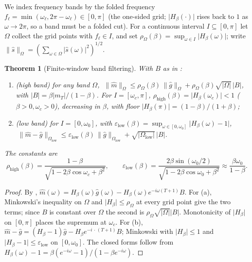 \documentclass[11pt,a4paper]{article}
\newtheorem{theorem}{Theorem}
\theoremstyle{remark}
\newcommand{\Hmag}[1]{\lvert H_\beta(#1)\rvert}
\newcommand{\rhohigh}{\rho_{\mathrm{high}}}
\newcommand{\epslow}{\varepsilon_{\mathrm{low}}}
\begin{document}
We index frequency bands by the folded frequency $f_\ell=\min(\omega_\ell,2\pi-\omega_\ell)\in[0,\pi]$ (the one-sided grid; $\Hmag{\cdot}$ rises back to $1$ as $\omega\to2\pi$, so a band must be a folded cut).
For a continuous interval $I\subseteq[0,\pi]$ let $\Omega$ collect the grid points with $f_\ell\in I$, and set $\rho_\Omega(\beta)=\sup_{\omega\in I}\Hmag{\omega}$; write $\lVert\hat s\rVert_\Omega=(\sum_{\omega\in\Omega}\lvert\hat s(\omega)\rvert^2)^{1/2}$.

\begin{theorem}[Finite-window band filtering]
\label{thm:filter}
With $B$ as in :
\begin{enumerate}
\item[(a)] (high band) for any band $\Omega$, $\;\lVert\hat m\rVert_\Omega\le\rho_\Omega(\beta)\,\lVert\hat g\rVert_\Omega +\rho_\Omega(\beta)\sqrt{\lvert\Omega\rvert}\,\lvert B\rvert$, with $\lvert B\rvert=\beta\lvert m_T\rvert/(1-\beta)$.
For $I=[\omega_c,\pi]$, $\rhohigh(\beta)=\Hmag{\omega_c}<1$ ($\beta>0,\omega_c>0$), decreasing in $\beta$, with floor $\Hmag{\pi}=(1-\beta)/(1+\beta)$;
\item[(b)] (low band) for $I=[0,\omega_0]$, with $\epslow(\beta)=\sup_{\omega\in[0,\omega_0]}\lvert H_\beta(\omega)-1\rvert$, $\;\lVert\hat m-\hat g\rVert_{\Omega_{\mathrm{low}}}\le\epslow(\beta)\,\lVert\hat g\rVert_{\Omega_{\mathrm{low}}} +\sqrt{\lvert\Omega_{\mathrm{low}}\rvert}\,\lvert B\rvert$.
\end{enumerate}
The constants are
\[
\rhohigh(\beta)=\frac{1-\beta}{\sqrt{1-2\beta\cos\omega_c+\beta^2}},\qquad
\epslow(\beta)=\frac{2\beta\sin(\omega_0/2)}{\sqrt{1-2\beta\cos\omega_0+\beta^2}}\approx\frac{\beta\omega_0}{1-\beta}.
\]
\end{theorem}

\begin{proof}
By , $\hat m(\omega)=H_\beta(\omega)\hat g(\omega)-H_\beta(\omega)e^{-i\omega(T+1)}B$.
For (a), Minkowski's inequality on $\Omega$ and $\lvert H_\beta\rvert\le\rho_\Omega$ at every grid point give the two terms; since $B$ is constant over $\Omega$ the second is $\rho_\Omega\sqrt{\lvert\Omega\rvert}\lvert B\rvert$.
Monotonicity of $\lvert H_\beta\rvert$ on $[0,\pi]$ places the supremum at $\omega_c$.
For (b), $\hat m-\hat g=(H_\beta-1)\hat g-H_\beta e^{-i\,\cdot\,(T+1)}B$; Minkowski with $\lvert H_\beta\rvert\le1$ and $\lvert H_\beta-1\rvert\le\epslow$ on $[0,\omega_0]$.
The closed forms follow from $H_\beta(\omega)-1=\beta(e^{-i\omega}-1)/(1-\beta e^{-i\omega})$.
\end{proof}
\end{document}
